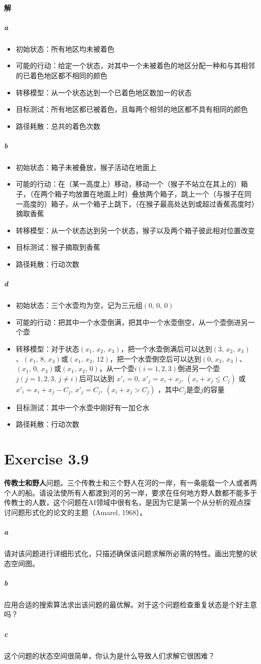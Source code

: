 \documentclass{article}
\begin{document}
\paragraph{解}
\subparagraph{a}
\begin{itemize}
    \item 初始状态：所有地区均未被着色
    \item 可能的行动：给定一个状态，对其中一个未被着色的地区分配一种和与其相邻的已着色地区都不相同的颜色
    \item 转移模型：从一个状态达到一个已着色地区数加一的状态
    \item 目标测试：所有地区都已被着色，且每两个相邻的地区都不具有相同的颜色
    \item 路径耗散：总共的着色次数
\end{itemize}
\subparagraph{b}
\begin{itemize}
    \item 初始状态：箱子未被叠放，猴子活动在地面上
    \item 可能的行动：在（某一高度上）移动，移动一个（猴子不站立在其上的）箱子，（在两个箱子均放置在地面上时）叠放两个箱子，跳上一个（与猴子在同一高度的）箱子，从一个箱子上跳下，（在猴子最高处达到或超过香蕉高度时）摘取香蕉
    \item 转移模型：从一个状态达到另一个状态，猴子以及两个箱子彼此相对位置改变
    \item 目标测试：猴子摘取到香蕉
    \item 路径耗散：行动次数
\end{itemize}
\subparagraph{d}
\begin{itemize}
    \item 初始状态：三个水壶均为空，记为三元组$(0,\,0,\,0)$
    \item 可能的行动：把其中一个水壶倒满，把其中一个水壶倒空，从一个壶倒进另一个壶
    \item 转移模型：对于状态$(x_1,\,x_2,\,x_3)$，把一个水壶倒满后可以达到$(3,\,x_2,\,x_3)$、$(x_1,\,8,\,x_3)$或$(x_1,\,x_2,\,12)$，把一个水壶倒空后可以达到$(0,\,x_2,\,x_3)$、$(x_1,\,0,\,x_3)$或$(x_1,\,x_2,\,0)$，从一个壶$i(i = 1,2,3)$倒进另一个壶$j(j = 1,2,3,\, j \neq i)$后可以达到 $x'_i = 0,\, x'_j = x_i + x_j,\ (x_i + x_j \leq C_j)$ 或 $x'_i = x_i + x_j - C_j,\, x'_j = C_j,\ (x_i + x_j > C_j)$ ，其中$C_j$是壶$j$的容量
    \item 目标测试：其中一个水壶中刚好有一加仑水
    \item 路径耗散：行动次数
\end{itemize}

\section{Exercise 3.9}
\textbf{传教士和野人}问题。三个传教士和三个野人在河的一岸，有一条能载一个人或者两个人的船。请设法使所有人都渡到河的另一岸，要求在任何地方野人数都不能多于传教士的人数，这个问题在AI领域中很有名，是因为它是第一个从分析的观点探讨问题形式化的论文的主题（Amarel, 1968）。
\subparagraph{a}
请对该问题进行详细形式化，只描述确保该问题求解所必需的特性。画出完整的状态空间图。
\subparagraph{b}
应用合适的搜索算法求出该问题的最优解。对于这个问题检查重复状态是个好主意吗？
\subparagraph{c}
这个问题的状态空间很简单，你认为是什么导致人们求解它很困难？
\end{document}
